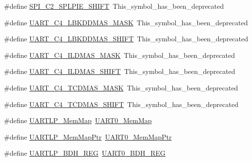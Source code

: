 \begin{DoxyCompactItemize}
\item 
\#define \hyperlink{group___backward___compatibility___symbols_ga6b417fe91e6264b06ed45234e4bdb987}{S\+P\+I\+\_\+\+C2\+\_\+\+S\+P\+L\+P\+I\+E\+\_\+\+S\+H\+I\+FT}~This\+\_\+symbol\+\_\+has\+\_\+been\+\_\+deprecated
\item 
\#define \hyperlink{group___backward___compatibility___symbols_ga4fbe0c821c729ee10ec2a5398d68e13f}{U\+A\+R\+T\+\_\+\+C4\+\_\+\+L\+B\+K\+D\+D\+M\+A\+S\+\_\+\+M\+A\+SK}~This\+\_\+symbol\+\_\+has\+\_\+been\+\_\+deprecated
\item 
\#define \hyperlink{group___backward___compatibility___symbols_gaa3e4b00c90d731ac214ec241c5739824}{U\+A\+R\+T\+\_\+\+C4\+\_\+\+L\+B\+K\+D\+D\+M\+A\+S\+\_\+\+S\+H\+I\+FT}~This\+\_\+symbol\+\_\+has\+\_\+been\+\_\+deprecated
\item 
\#define \hyperlink{group___backward___compatibility___symbols_ga12f2c283d457dabb4c399413da95290d}{U\+A\+R\+T\+\_\+\+C4\+\_\+\+I\+L\+D\+M\+A\+S\+\_\+\+M\+A\+SK}~This\+\_\+symbol\+\_\+has\+\_\+been\+\_\+deprecated
\item 
\#define \hyperlink{group___backward___compatibility___symbols_ga696b99c80acb65a95530c792e61158a5}{U\+A\+R\+T\+\_\+\+C4\+\_\+\+I\+L\+D\+M\+A\+S\+\_\+\+S\+H\+I\+FT}~This\+\_\+symbol\+\_\+has\+\_\+been\+\_\+deprecated
\item 
\#define \hyperlink{group___backward___compatibility___symbols_ga9a5b6a456c330e9d6b15e612c6e5725a}{U\+A\+R\+T\+\_\+\+C4\+\_\+\+T\+C\+D\+M\+A\+S\+\_\+\+M\+A\+SK}~This\+\_\+symbol\+\_\+has\+\_\+been\+\_\+deprecated
\item 
\#define \hyperlink{group___backward___compatibility___symbols_gad7b56c2826bb55b9112c190448d01176}{U\+A\+R\+T\+\_\+\+C4\+\_\+\+T\+C\+D\+M\+A\+S\+\_\+\+S\+H\+I\+FT}~This\+\_\+symbol\+\_\+has\+\_\+been\+\_\+deprecated
\item 
\#define \hyperlink{group___backward___compatibility___symbols_ga92b653c99e40007d3c3339a79fa0e6a5}{U\+A\+R\+T\+L\+P\+\_\+\+Mem\+Map}~\hyperlink{struct_u_a_r_t0___mem_map}{U\+A\+R\+T0\+\_\+\+Mem\+Map}
\item 
\#define \hyperlink{group___backward___compatibility___symbols_ga589ef759d83410b6f02bd68fcc3bf090}{U\+A\+R\+T\+L\+P\+\_\+\+Mem\+Map\+Ptr}~\hyperlink{group___u_a_r_t0___peripheral_gae795171499e041fb9b8f6ad5b97f896b}{U\+A\+R\+T0\+\_\+\+Mem\+Map\+Ptr}
\item 
\#define \hyperlink{group___backward___compatibility___symbols_ga30ce68ea180cb316cc6ba162f5070dd0}{U\+A\+R\+T\+L\+P\+\_\+\+B\+D\+H\+\_\+\+R\+EG}~\hyperlink{group___u_a_r_t0___register___accessor___macros_ga1786ecc749d15c69e1f6b3ebb5b07976}{U\+A\+R\+T0\+\_\+\+B\+D\+H\+\_\+\+R\+EG}

\end{DoxyCompactItemize}
